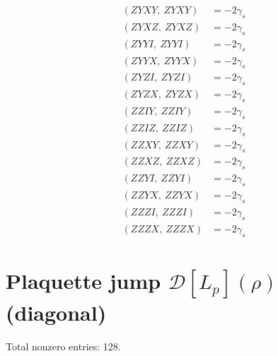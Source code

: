 \documentclass{article}
\begin{document}
\begin{align*}
  (ZYXY,\ ZYXY) &= - 2 \gamma_{s} \\
  (ZYXZ,\ ZYXZ) &= - 2 \gamma_{s} \\
  (ZYYI,\ ZYYI) &= - 2 \gamma_{s} \\
  (ZYYX,\ ZYYX) &= - 2 \gamma_{s} \\
  (ZYZI,\ ZYZI) &= - 2 \gamma_{s} \\
  (ZYZX,\ ZYZX) &= - 2 \gamma_{s} \\
  (ZZIY,\ ZZIY) &= - 2 \gamma_{s} \\
  (ZZIZ,\ ZZIZ) &= - 2 \gamma_{s} \\
  (ZZXY,\ ZZXY) &= - 2 \gamma_{s} \\
  (ZZXZ,\ ZZXZ) &= - 2 \gamma_{s} \\
  (ZZYI,\ ZZYI) &= - 2 \gamma_{s} \\
  (ZZYX,\ ZZYX) &= - 2 \gamma_{s} \\
  (ZZZI,\ ZZZI) &= - 2 \gamma_{s} \\
  (ZZZX,\ ZZZX) &= - 2 \gamma_{s}
\end{align*}
\section*{Plaquette jump $\mathcal{D}[L_p](\rho)$ (diagonal)}
Total nonzero entries: 128.
\end{document}

